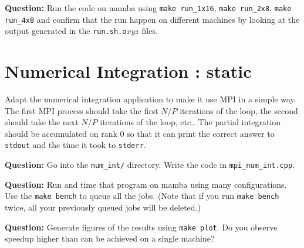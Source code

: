 \documentclass{article}
\newcommand{\question}{{\noindent \bf Question: }}
\begin{document}
\question Run the code on mamba using \texttt{make run\_1x16},
\texttt{make run\_2x8}, \texttt{make run\_4x8} and confirm that the
run happen on different machines by looking at the output generated in
the \texttt{run.sh.o$xyz$} files.

\section{Numerical Integration : static} 

Adapt the numerical integration application to make it use
MPI in a simple way. The first MPI process should take the first $N/P$
iterations of the loop, the second should take the next $N/P$
iterations of the loop, etc.. The partial integration should be
accumulated on rank 0 so that it can print the correct answer to
\texttt{stdout} and the time it took to \texttt{stderr}.

\question Go into the \texttt{num\_int/} directory. Write the code in
\texttt{mpi\_num\_int.cpp}.

\question Run and time that program on mamba using many
configurations. Use the \texttt{make bench} to queue all the
jobs. (Note that if you run \texttt{make bench} twice, all your
previously queued jobs will be deleted.)

\question Generate figures of the results using \texttt{make plot}. Do
you observe speedup higher than can be achieved on a single machine?
\end{document}
